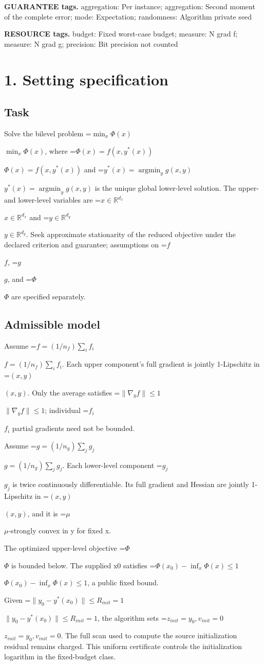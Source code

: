 \documentclass[10pt,a4paper]{article}
\newcommand{\AtlasMath}[1]{\par\begingroup\centering\setbox0=\hbox{$\displaystyle #1$}\ifdim\wd0>1.4\linewidth\typeout{ATLAS WIDE FORMULA: \the\wd0}\fi\ifdim\wd0>\linewidth\resizebox{\linewidth}{!}{\box0}\else\box0\fi\par\endgroup}
\newcommand{\AtlasInlineMath}[1]{\begingroup\setbox0=\hbox{$#1$}\ifdim\wd0>.4\linewidth\endgroup\AtlasMath{#1}\else\endgroup$#1$\fi}
\begin{document}
\textbf{GUARANTEE tags.} aggregation: Per instance; aggregation: Second moment of the complete error; mode: Expectation; randomness: Algorithm private seed

\textbf{RESOURCE tags.} budget: Fixed worst-case budget; measure: N grad f; measure: N grad g; precision: Bit precision not counted

\section{1. Setting specification}
\subsection{Task}
Solve the bilevel problem \AtlasInlineMath{\min_x\Phi(x)}, where \AtlasInlineMath{\Phi(x)=f(x,y^*(x))} and \AtlasInlineMath{y^*(x)=\operatorname*{argmin}_y g(x,y)} is the unique global lower-level solution. The upper- and lower-level variables are \AtlasInlineMath{x\in\mathbb{R}^{d_x}} and \AtlasInlineMath{y\in\mathbb{R}^{d_y}}. Seek approximate stationarity of the reduced objective under the declared criterion and guarantee; assumptions on \AtlasInlineMath{f}, \AtlasInlineMath{g}, and \AtlasInlineMath{\Phi} are specified separately.

\subsection{Admissible model}
Assume \AtlasInlineMath{f=(1/n_f)\sum_i f_i}. Each upper component's full gradient is jointly 1-Lipschitz in \AtlasInlineMath{(x,y)}. Only the average satisfies \AtlasInlineMath{\|\nabla_y f\|\le1}; individual \AtlasInlineMath{f_i} partial gradients need not be bounded.

Assume \AtlasInlineMath{g=(1/n_g)\sum_j g_j}. Each lower-level component \AtlasInlineMath{g_j} is twice continuously differentiable. Its full gradient and Hessian are jointly 1-Lipschitz in \AtlasInlineMath{(x,y)}, and it is \AtlasInlineMath{\mu}-strongly convex in y for fixed x.

The optimized upper-level objective \AtlasInlineMath{\Phi} is bounded below. The supplied x0 satisfies \AtlasInlineMath{\Phi(x_0)-\inf_x\Phi(x)\le1}, a public fixed bound.

Given \AtlasInlineMath{\|y_0-y^*(x_0)\|\le R_{init}=1}, the algorithm sets \AtlasInlineMath{z_{init}=y_0,v_{init}=0}. The full scan used to compute the source initialization residual remains charged. This uniform certificate controls the initialization logarithm in the fixed-budget class.
\end{document}
